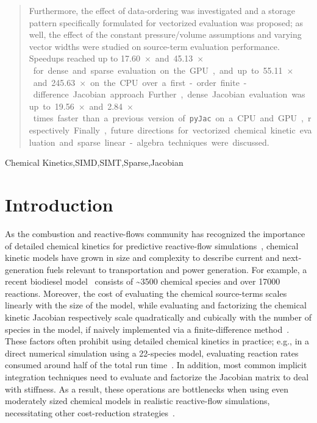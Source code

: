 \documentclass[12pt,number,sort&compress,preprint]{elsarticle}
\begin{document}
\begin{frontmatter}
\begin{abstract}
Furthermore, the effect of data-ordering was investigated and a storage pattern specifically formulated for vectorized evaluation was proposed; as well, the effect of the constant pressure\slash volume assumptions and varying vector widths were studied on source-term evaluation performance.
Speedups reached up to \SI{17.60}{$\times$} and \SI{45.13}{$\times$} for dense and sparse evaluation on the GPU, and up to \SI{55.11}{$\times$} and \SI{245.63}{$\times$} on the CPU over a first-order finite-difference  Jacobian approach.
Further, dense Jacobian evaluation was up to \SI{19.56}{$\times$} and \SI{2.84}{$\times$} times faster than a previous version of \texttt{pyJac} on a CPU and GPU, respectively.
Finally, future directions for vectorized chemical kinetic evaluation and sparse linear-algebra techniques were discussed.
\end{abstract}

\begin{keyword}
    Chemical Kinetics\sep SIMD\sep SIMT\sep Sparse\sep Jacobian
\end{keyword}

\end{frontmatter}

\section{Introduction}
%

As the combustion and reactive-flows community has recognized the importance of detailed chemical kinetics for predictive reactive-flow simulations~\cite{LU2009192}, chemical kinetic models have grown in size and complexity to describe current and next-generation fuels relevant to transportation and power generation.
For example, a recent biodiesel model~\cite{WESTBROOK2011742} consists of \textasciitilde\num{3500} chemical species and over \num{17000} reactions.
Moreover, the cost of evaluating the chemical source-terms scales linearly with the size of the model, while evaluating and factorizing the chemical kinetic Jacobian respectively scale quadratically and cubically with the number of species in the model, if naively implemented via a finite-difference method~\cite{LU2009192}.
These factors often prohibit using detailed chemical kinetics in practice; e.g., in a direct numerical simulation using a 22-species model, evaluating reaction rates consumed around half of the total run time~\cite{Spafford:2010aa}.
In addition, most common implicit integration techniques need to evaluate and factorize the Jacobian matrix to deal with stiffness.
As a result, these operations are bottlenecks when using even moderately sized chemical models in realistic reactive-flow simulations, necessitating other cost-reduction strategies~\cite{LU2009192}.
\end{document}
